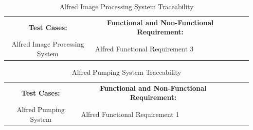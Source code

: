 \documentclass [10pt]{article}
\begin{document}
\begin{table}[h!]
\centering
\begin{tabular}{lllll}
\cline{1-2}
\multicolumn{1}{|c|}{\textbf{Test Cases:}} & \multicolumn{1}{c|}{\textbf{Functional and Non-Functional Requirement:}} &  &  &  \\ \cline{1-2}
\multicolumn{1}{|c|}{\multirow{1}{*}{Alfred Image Processing System}} & \multicolumn{1}{l|}{Alfred Functional Requirement 3} &  &  &  \\ \cline{1-2}
\end{tabular}
\caption{Alfred Image Processing System Traceability}
\end{table}

\begin{table}[h!]
\centering
\begin{tabular}{lllll}
\cline{1-2}
\multicolumn{1}{|c|}{\textbf{Test Cases:}} & \multicolumn{1}{c|}{\textbf{Functional and Non-Functional Requirement:}} &  &  &  \\ \cline{1-2}
\multicolumn{1}{|c|}{\multirow{1}{*}{Alfred Pumping System}} & \multicolumn{1}{l|}{Alfred Functional Requirement 1} &  &  &  \\ \cline{1-2}
\end{tabular}
\caption{Alfred Pumping System Traceability}
\end{table}
\end{document}
